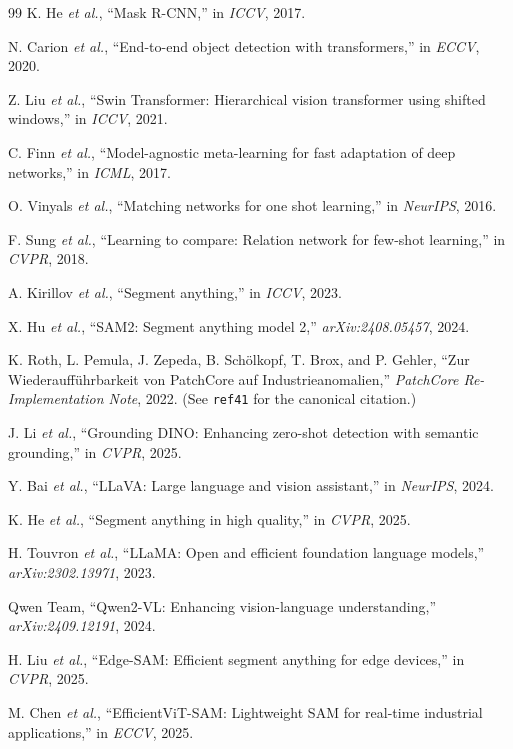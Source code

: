 \documentclass[journal]{IEEEtran}
\begin{document}
\begin{thebibliography}{99}
 K. He \textit{et al.}, ``Mask R-CNN,'' in \textit{ICCV}, 2017.

 N. Carion \textit{et al.}, ``End-to-end object detection with transformers,'' in \textit{ECCV}, 2020.

 Z. Liu \textit{et al.}, ``Swin Transformer: Hierarchical vision transformer using shifted windows,'' in \textit{ICCV}, 2021.

 C. Finn \textit{et al.}, ``Model-agnostic meta-learning for fast adaptation of deep networks,'' in \textit{ICML}, 2017.

 O. Vinyals \textit{et al.}, ``Matching networks for one shot learning,'' in \textit{NeurIPS}, 2016.

 F. Sung \textit{et al.}, ``Learning to compare: Relation network for few-shot learning,'' in \textit{CVPR}, 2018.

 A. Kirillov \textit{et al.}, ``Segment anything,'' in \textit{ICCV}, 2023.

 X. Hu \textit{et al.}, ``SAM2: Segment anything model 2,'' \textit{arXiv:2408.05457}, 2024.

 K. Roth, L. Pemula, J. Zepeda, B. Sch\"olkopf, T. Brox, and P. Gehler, ``Zur Wiederauff\"uhrbarkeit von PatchCore auf Industrieanomalien,'' \textit{PatchCore Re-Implementation Note}, 2022. (See \texttt{ref41} for the canonical citation.)

 J. Li \textit{et al.}, ``Grounding DINO: Enhancing zero-shot detection with semantic grounding,'' in \textit{CVPR}, 2025.

 Y. Bai \textit{et al.}, ``LLaVA: Large language and vision assistant,'' in \textit{NeurIPS}, 2024.

 K. He \textit{et al.}, ``Segment anything in high quality,'' in \textit{CVPR}, 2025.

 H. Touvron \textit{et al.}, ``LLaMA: Open and efficient foundation language models,'' \textit{arXiv:2302.13971}, 2023.

 Qwen Team, ``Qwen2-VL: Enhancing vision-language understanding,'' \textit{arXiv:2409.12191}, 2024.

 H. Liu \textit{et al.}, ``Edge-SAM: Efficient segment anything for edge devices,'' in \textit{CVPR}, 2025.

 M. Chen \textit{et al.}, ``EfficientViT-SAM: Lightweight SAM for real-time industrial applications,'' in \textit{ECCV}, 2025.


\end{thebibliography}
\end{document}
